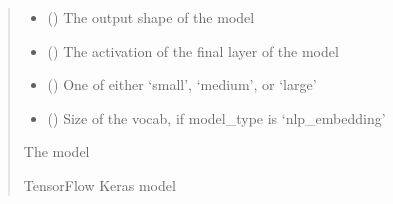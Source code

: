 \documentclass[letterpaper,10pt,english]{sphinxmanual}
\begin{document}
\begin{fulllineitems}
\begin{quote}
\begin{description}
\begin{itemize}
\item {} 
\sphinxAtStartPar
{} () \textendash{} The output shape of the model

\item {} 
\sphinxAtStartPar
{} () \textendash{} The activation of the final layer of the model

\item {} 
\sphinxAtStartPar
{} (\sphinxstyleliteralemphasis{\sphinxupquote{ (}}\sphinxstyleliteralemphasis{\sphinxupquote{)}}) \textendash{} One of either ‘small’, ‘medium’, or ‘large’

\item {} 
\sphinxAtStartPar
{} (\sphinxstyleliteralemphasis{\sphinxupquote{ (}}\sphinxstyleliteralemphasis{\sphinxupquote{)}}) \textendash{} Size of the vocab, if model\_type is ‘nlp\_embedding’

\end{itemize}

\sphinxAtStartPar
{} \textendash{} The model

\sphinxAtStartPar
TensorFlow Keras model

\end{description}\end{quote}

\end{fulllineitems}

\end{document}
